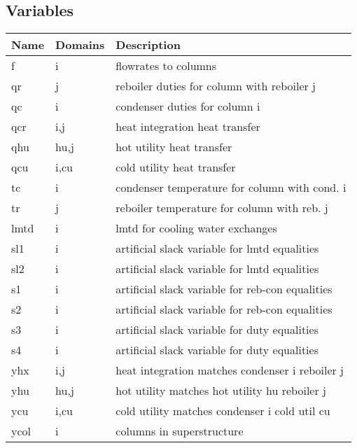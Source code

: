 \documentclass[11pt]{article}
\begin{document}
\subsection*{Variables}
\begin{tabularx}{\textwidth}{| l | l | X |}
\hline
\textbf{Name} & \textbf{Domains} & \textbf{Description}\\
\hline
\endhead

f & i & flowrates to columns\\
qr & j & reboiler duties for column with reboiler j\\
qc & i & condenser duties for column i\\
qcr & i,j & heat integration heat transfer\\
qhu & hu,j & hot utility heat transfer\\
qcu & i,cu & cold utility heat transfer\\
tc & i & condenser temperature for column with cond. i\\
tr & j & reboiler temperature for column with reb. j\\
lmtd & i & lmtd for cooling water exchanges\\
sl1 & i & artificial slack variable for lmtd equalities\\
sl2 & i & artificial slack variable for lmtd equalities\\
s1 & i & artificial slack variable for reb-con equalities\\
s2 & i & artificial slack variable for reb-con equalities\\
s3 & i & artificial slack variable for duty equalities\\
s4 & i & artificial slack variable for duty equalities\\
yhx & i,j & heat integration matches condenser i reboiler j\\
yhu & hu,j & hot utility matches hot utility hu reboiler j\\
ycu & i,cu & cold utility matches condenser i cold util cu\\
ycol & i & columns in superstructure\\
\hline
\end{tabularx}
\end{document}
